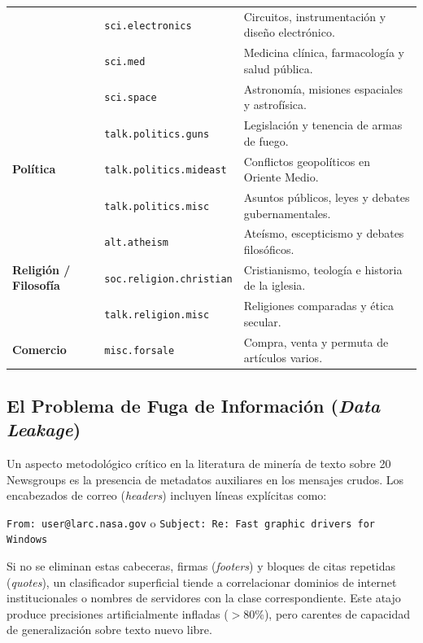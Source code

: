 \documentclass[12pt, a4paper]{article}
\begin{document}
\begin{table}[H]
\begin{tabular}{@{}llp{5.6cm}@{}}
        & \texttt{sci.electronics} & Circuitos, instrumentación y diseño electrónico. \\
        & \texttt{sci.med} & Medicina clínica, farmacología y salud pública. \\
        & \texttt{sci.space} & Astronomía, misiones espaciales y astrofísica. \\
        \midrule
        \multirow{3}{*}{\textbf{Política}} 
        & \texttt{talk.politics.guns} & Legislación y tenencia de armas de fuego. \\
        & \texttt{talk.politics.mideast} & Conflictos geopolíticos en Oriente Medio. \\
        & \texttt{talk.politics.misc} & Asuntos públicos, leyes y debates gubernamentales. \\
        \midrule
        \multirow{3}{*}{\textbf{Religión / Filosofía}} 
        & \texttt{alt.atheism} & Ateísmo, escepticismo y debates filosóficos. \\
        & \texttt{soc.religion.christian} & Cristianismo, teología e historia de la iglesia. \\
        & \texttt{talk.religion.misc} & Religiones comparadas y ética secular. \\
        \midrule
        \textbf{Comercio} 
        & \texttt{misc.forsale} & Compra, venta y permuta de artículos varios. \\
        \bottomrule
    \end{tabular}
\end{table}

\subsection{El Problema de Fuga de Información (\textit{Data Leakage})}

Un aspecto metodológico crítico en la literatura de minería de texto sobre 20 Newsgroups es la presencia de metadatos auxiliares en los mensajes crudos. Los encabezados de correo (\textit{headers}) incluyen líneas explícitas como:
\begin{center}
\texttt{From: user@larc.nasa.gov} \quad o \quad \texttt{Subject: Re: Fast graphic drivers for Windows}
\end{center}
Si no se eliminan estas cabeceras, firmas (\textit{footers}) y bloques de citas repetidas (\textit{quotes}), un clasificador superficial tiende a correlacionar dominios de internet institucionales o nombres de servidores con la clase correspondiente. Este atajo produce precisiones artificialmente infladas ($>80\%$), pero carentes de capacidad de generalización sobre texto nuevo libre.
\end{document}

